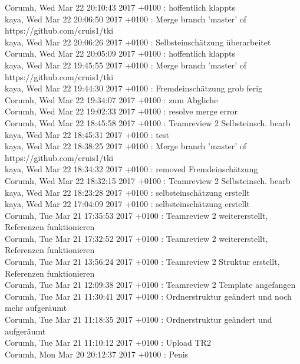 Corumh, Wed Mar 22 20:10:43 2017 +0100 : hoffentlich klappts\\
kaya, Wed Mar 22 20:06:50 2017 +0100 : Merge branch 'master' of https://github.com/cruis1/tki\\
kaya, Wed Mar 22 20:06:26 2017 +0100 : Selbsteinschätzung überarbeitet\\
Corumh, Wed Mar 22 20:05:09 2017 +0100 : hoffentlich klappts\\
kaya, Wed Mar 22 19:45:55 2017 +0100 : Merge branch 'master' of https://github.com/cruis1/tki\\
kaya, Wed Mar 22 19:44:30 2017 +0100 : Fremdeinschätzung grob ferig\\
Corumh, Wed Mar 22 19:34:07 2017 +0100 : zum Abgliche\\
Corumh, Wed Mar 22 19:02:33 2017 +0100 : resolve merge error\\
Corumh, Wed Mar 22 18:45:58 2017 +0100 : Teamreview 2 Selbsteinsch. bearb\\
kaya, Wed Mar 22 18:45:31 2017 +0100 : test\\
kaya, Wed Mar 22 18:38:25 2017 +0100 : Merge branch 'master' of https://github.com/cruis1/tki\\
kaya, Wed Mar 22 18:34:32 2017 +0100 : removed Fremdeinschätzung\\
Corumh, Wed Mar 22 18:32:15 2017 +0100 : Teamreview 2 Selbsteinsch. bearb\\
kaya, Wed Mar 22 18:23:28 2017 +0100 : selbsteinschätzung erstellt\\
kaya, Wed Mar 22 17:04:09 2017 +0100 : selbsteinschätzung erstellt\\
Corumh, Tue Mar 21 17:35:53 2017 +0100 : Teamreview 2 weitererstellt, Referenzen funktionieren\\
Corumh, Tue Mar 21 17:32:52 2017 +0100 : Teamreview 2 weitererstellt, Referenzen funktionieren\\
Corumh, Tue Mar 21 13:56:24 2017 +0100 : Teamreview 2 Struktur erstellt, Referenzen funktionieren\\
Corumh, Tue Mar 21 12:09:38 2017 +0100 : Teamreview 2 Template angefangen\\
Corumh, Tue Mar 21 11:30:41 2017 +0100 : Ordnerstruktur geändert und noch mehr aufgeräumt\\
Corumh, Tue Mar 21 11:18:35 2017 +0100 : Ordnerstruktur geändert und aufgeräumt\\
Corumh, Tue Mar 21 11:10:12 2017 +0100 : Upload TR2\\
Corumh, Mon Mar 20 20:12:37 2017 +0100 : Penis\\
